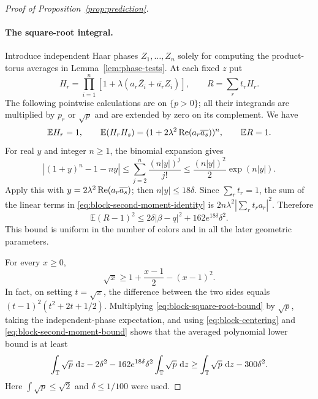 \begin{proof}[Proof of Proposition~\ref{prop:prediction}]
\paragraph{The square-root integral.}
Introduce independent Haar phases $Z_1,\ldots,Z_n$ solely for
computing the product-torus averages in
Lemma~\ref{lem:phase-tests}.  At each fixed $z$ put
\[
 H_r=\prod_{i=1}^n
       [1+\lambda(a_r\overline{Z_i}+\overline{a_r}Z_i)],
 \qquad R=\sum_r t_rH_r.
\]
The following pointwise calculations are on $\{p>0\}$; all their
integrands are multiplied by $p_r$ or $\sqrt p$ and are extended by
zero on its complement.  We have
\begin{equation}
 \mathbb E H_r=1,
 \qquad
 \mathbb E(H_rH_s)
       =(1+2\lambda^2\operatorname{Re}(a_r\overline{a_s}))^n,
 \qquad \mathbb E R=1.
 \label{eq:block-second-moment-identity}
\end{equation}
For real $y$ and integer $n\ge1$, the binomial expansion gives
\[
 |(1+y)^n-1-ny|
 \le\sum_{j=2}^n\frac{(n|y|)^j}{j!}
 \le\frac{(n|y|)^2}{2}\exp(n|y|).
\]
Apply this with $y=2\lambda^2\operatorname{Re}(a_r\overline{a_s})$;
then $n|y|\le18\delta$.  Since $\sum_rt_r=1$, the sum of the
linear terms in \eqref{eq:block-second-moment-identity} is
$2n\lambda^2|\sum_rt_ra_r|^2$.  Therefore
\begin{equation}
 \mathbb E(R-1)^2
 \le2\delta|\beta-q|^2+162e^{18\delta}\delta^2.
 \label{eq:block-second-moment-bound}
\end{equation}
This bound is uniform in the number of colors and in all the later
geometric parameters.

For every $x\ge0$,
\begin{equation}
 \sqrt x\ge1+\frac{x-1}{2}-(x-1)^2.
 \label{eq:block-square-root-bound}
\end{equation}
In fact, on setting $t=\sqrt x$, the difference between the two sides
equals $(t-1)^2(t^2+2t+1/2)$.  Multiplying
\eqref{eq:block-square-root-bound} by $\sqrt p$, taking the
independent-phase expectation, and using
\eqref{eq:block-centering} and \eqref{eq:block-second-moment-bound}
shows that the averaged polynomial lower bound is at least
\[
 \int_\mathbb T\sqrt p\,\,\mathrm d z
 -2\delta^2-162e^{18\delta}\delta^2\int_\mathbb T\sqrt p\,\,\mathrm d z
 \ge \int_\mathbb T\sqrt p\,\,\mathrm d z-300\delta^2.
\]
Here $\int\sqrt p\le\sqrt2$ and $\delta\le1/100$ were used.


\end{proof}
